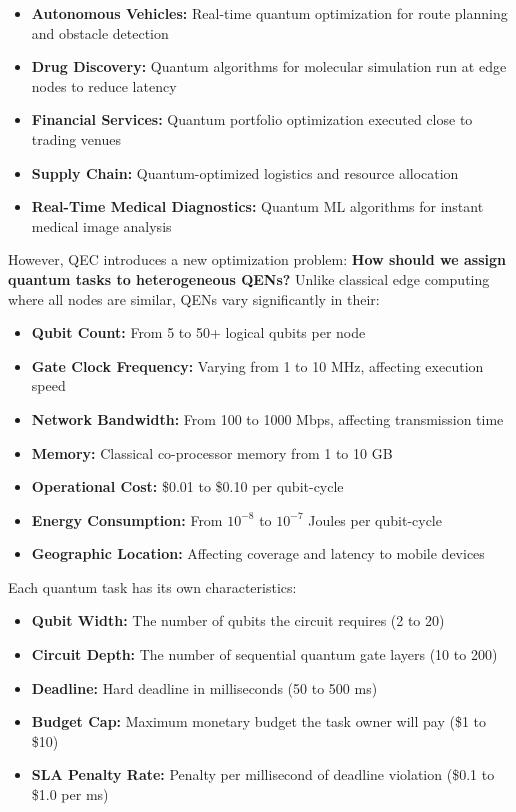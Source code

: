 \documentclass[12pt,a4paper]{article}
\begin{document}
\begin{itemize}
  \item \textbf{Autonomous Vehicles:} Real-time quantum optimization for route planning and obstacle detection
  \item \textbf{Drug Discovery:} Quantum algorithms for molecular simulation run at edge nodes to reduce latency
  \item \textbf{Financial Services:} Quantum portfolio optimization executed close to trading venues
  \item \textbf{Supply Chain:} Quantum-optimized logistics and resource allocation
  \item \textbf{Real-Time Medical Diagnostics:} Quantum ML algorithms for instant medical image analysis
\end{itemize}

However, QEC introduces a new optimization problem: \textbf{How should we assign quantum tasks to heterogeneous QENs?} Unlike classical edge computing where all nodes are similar, QENs vary significantly in their:

\begin{itemize}
  \item \textbf{Qubit Count:} From 5 to 50+ logical qubits per node
  \item \textbf{Gate Clock Frequency:} Varying from 1 to 10 MHz, affecting execution speed
  \item \textbf{Network Bandwidth:} From 100 to 1000 Mbps, affecting transmission time
  \item \textbf{Memory:} Classical co-processor memory from 1 to 10 GB
  \item \textbf{Operational Cost:} \$0.01 to \$0.10 per qubit-cycle
  \item \textbf{Energy Consumption:} From $10^{-8}$ to $10^{-7}$ Joules per qubit-cycle
  \item \textbf{Geographic Location:} Affecting coverage and latency to mobile devices
\end{itemize}

Each quantum task has its own characteristics:

\begin{itemize}
  \item \textbf{Qubit Width:} The number of qubits the circuit requires (2 to 20)
  \item \textbf{Circuit Depth:} The number of sequential quantum gate layers (10 to 200)
  \item \textbf{Deadline:} Hard deadline in milliseconds (50 to 500 ms)
  \item \textbf{Budget Cap:} Maximum monetary budget the task owner will pay (\$1 to \$10)
  \item \textbf{SLA Penalty Rate:} Penalty per millisecond of deadline violation (\$0.1 to \$1.0 per ms)
\end{itemize}
\end{document}
